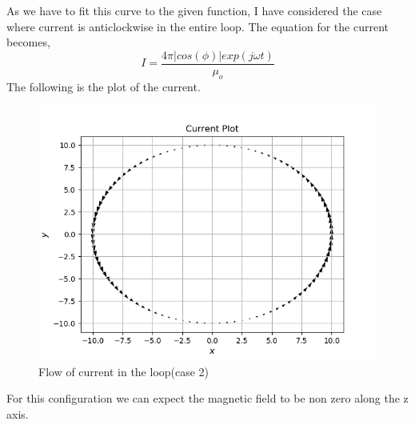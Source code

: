 \documentclass[11pt, a4paper]{article}
\begin{document}
As we have to fit this curve to the given function, I have considered the case where current is anticlockwise in the entire loop. The equation for the current becomes,
\begin{equation}\label{eq:1}
I = \frac{4\pi |cos(\phi)| exp(j\omega t)}{\mu_o}
\end{equation}
The following is the plot of the current.
\begin{figure}[!tbh]
   	\centering
   	\includegraphics[scale=0.5]{fig4.png}  %
   	\caption{Flow of current in the loop(case 2)}
   	\label{fig:sample}
   \end{figure}
For this configuration we can expect the magnetic field to be non zero along the z axis.
\newpage
\end{document}
